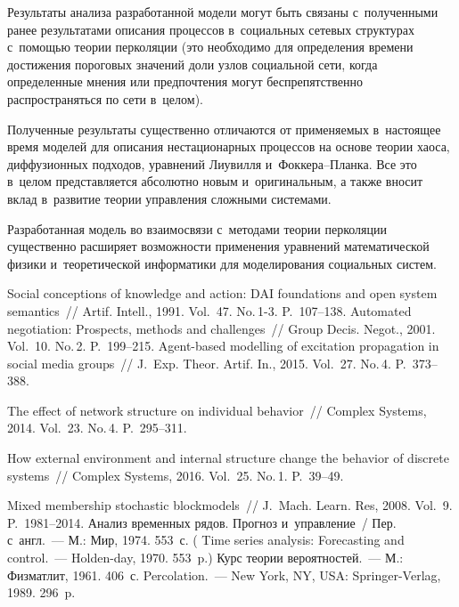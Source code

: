 \begin{multicols}{2}
  Результаты анализа разработанной модели могут быть связаны 
с~полученными ранее результатами описания процессов в~социальных сетевых 
структурах с~помощью теории перколяции (это необходимо для определения 
времени достижения пороговых значений доли узлов социальной сети, когда 
определенные мнения или предпочтения могут беспрепятственно 
распространяться по сети в~целом).
  
  Полученные результаты существенно отличаются от применяемых 
в~настоящее время моделей для описания нестационарных процессов на 
основе тео\-рии хаоса, диффузионных подходов, уравнений Лиувилля  
и~Фок\-ке\-ра--План\-ка. Все это в~целом представляется абсолютно новым 
и~оригинальным, а также вносит вклад в~развитие теории управления 
сложными системами.
  
  Разработанная модель во взаимосвязи с~методами теории перколяции 
существенно расширяет возможности применения уравнений математической 
физики и~теоретической информатики для моделирования социальных систем.

\vspace*{-6pt}
  
{\small\frenchspacing
{\baselineskip=10.85pt
\begin{thebibliography}{99}
 Social conceptions of knowledge and action: DAI foundations and open system 
semantics~// Artif. Intell., 1991. Vol.~47. No.\,1-3. P.~107--138.
Automated negotiation: Prospects, methods and challenges~// Group Decis.
Negot., 2001. Vol.~10. No.\,2. P.~199--215.
 Agent-based modelling of excitation propagation in 
social media groups~// J.~Exp. Theor. Artif. In., 2015. Vol.~27. No.\,4. 
P.~373--388.

 The effect of network structure on individual behavior~// Complex Systems, 
2014. Vol.~23. No.\,4. P.~295--311.

 How external environment and internal structure change the behavior of 
discrete systems~// Complex Systems, 2016. Vol.~25. No.\,1. P.~39--49.

 Mixed membership stochastic 
blockmodels~// J.~Mach. Learn. Res, 2008. Vol.~9. P.~1981--2014.
 Анализ временных рядов. Прогноз и~управление~/ Пер. 
с~англ.~--- М.: Мир, 1974. 553~с. ( Time series analysis: 
Forecasting and control.~--- Holden-day, 1970. 553~p.)
 Курс теории вероятностей.~--- М.: Физматлит, 1961. 406~с.
 Percolation.~--- New York, NY, USA: Springer-Verlag, 1989. 296~p.


\end{thebibliography}}}
\end{multicols}
